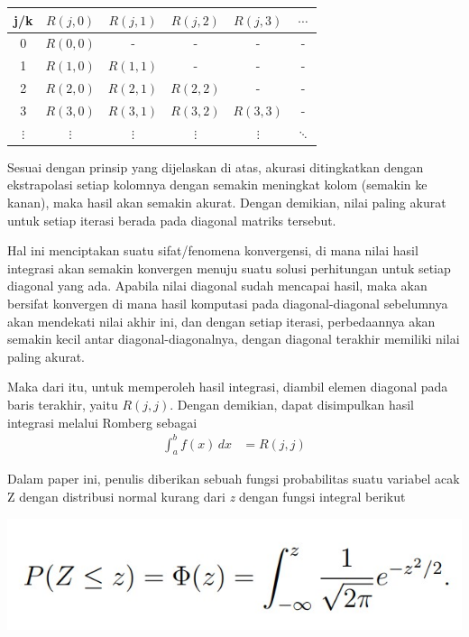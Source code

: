 \documentclass[journal,12pt,onecolumn,a4paper]{IEEEtran}
\begin{document}
\begin{center}
	\begin{tabular}{ c | c c c c c }

		j/k        & \(R(j,0)\) & \(R(j,1)\) & \(R(j,2)\) & \(R(j,3)\) & \(\cdots\) \\
		\hline
		0          & \(R(0,0)\) & -          & -          & -          & -          \\
		1          & \(R(1,0)\) & \(R(1,1)\) & -          & -          & -          \\
		2          & \(R(2,0)\) & \(R(2,1)\) & \(R(2,2)\) & -          & -          \\
		3          & \(R(3,0)\) & \(R(3,1)\) & \(R(3,2)\) & \(R(3,3)\) & -          \\
		\(\vdots\) & \(\vdots\) & \(\vdots\) & \(\vdots\) & \(\vdots\) & \(\ddots\) \\
	\end{tabular}
\end{center}

Sesuai dengan prinsip yang dijelaskan di atas, akurasi ditingkatkan dengan ekstrapolasi setiap kolomnya dengan semakin meningkat kolom (semakin ke kanan), maka hasil akan semakin akurat. Dengan demikian, nilai paling akurat untuk setiap iterasi berada pada diagonal matriks tersebut.

Hal ini menciptakan suatu sifat/fenomena konvergensi, di mana nilai hasil integrasi akan semakin konvergen menuju suatu solusi perhitungan untuk setiap diagonal yang ada. Apabila nilai diagonal sudah mencapai hasil, maka akan bersifat konvergen di mana hasil komputasi pada diagonal-diagonal sebelumnya akan mendekati nilai akhir ini, dan dengan setiap iterasi, perbedaannya akan semakin kecil antar diagonal-diagonalnya, dengan diagonal terakhir memiliki nilai paling akurat.

Maka dari itu, untuk memperoleh hasil integrasi, diambil elemen diagonal pada baris terakhir, yaitu \(R(j,j)\). Dengan demikian, dapat disimpulkan hasil integrasi melalui Romberg sebagai
\begin{equation*}
	\begin{split}
		\int_{a}^{b} f(x) \,dx & = R(j,j)
	\end{split}
\end{equation*}


Dalam paper ini, penulis diberikan sebuah fungsi probabilitas suatu variabel acak Z dengan distribusi normal kurang dari \emph{z} dengan fungsi integral berikut

\includegraphics[scale=0.6, center]{func2.jpg}
\end{document}
